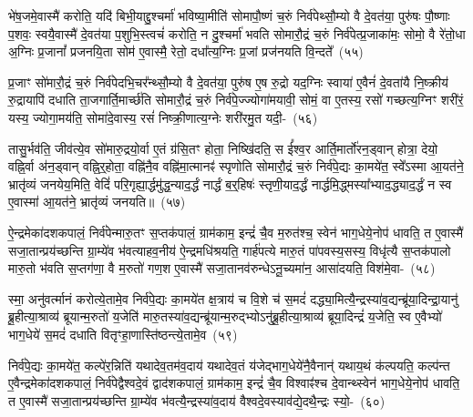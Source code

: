 भे॑ष॒जमे॒वास्मै॑ करोति॒ यदि॑ बिभी॒याद्दु॒श्चर्मा॑ भविष्या॒मीति॑ सोमापौ॒ष्णं च॒रुं निर्व॑पेथ्सौ॒म्यो वै दे॒वत॑या॒ पुरु॑षः पौ॒ष्णाः प॒शवः॒ स्वयै॒वास्मै॑ दे॒वत॑या प॒शुभि॒स्त्वचं॑ करोति॒ न दु॒श्चर्मा॑ भवति सोमारौ॒द्रं च॒रुं निर्व॑पेत्प्र॒जाका॑मः॒ सोमो॒ वै रे॑तो॒धा अ॒ग्निः प्र॒जानां᳚ प्रजनयि॒ता सोम॑ ए॒वास्मै॒ रेतो॒ दधा᳚त्य॒ग्निः प्र॒जां प्रज॑नयति वि॒न्दते᳚~(५५)

प्र॒जाꣳ सो॑मारौ॒द्रं च॒रुं निर्व॑पेदभि॒चर᳚न्थ्सौ॒म्यो वै दे॒वत॑या॒ पुरु॑ष ए॒ष रु॒द्रो यद॒ग्निः स्वाया॑ ए॒वैनं॑ दे॒वता॑यै नि॒ष्क्रीय॑ रु॒द्रायापि॑ दधाति ता॒जगार्ति॒मार्च्छ॑ति सोमारौ॒द्रं च॒रुं निर्व॑पे॒ज्ज्योगा॑मयावी॒ सोमं॒ वा ए॒तस्य॒ रसो॑ गच्छत्य॒ग्निꣳ शरी॑रं॒ यस्य॒ ज्योगा॒मय॑ति॒ सोमा॑दे॒वास्य॒ रसं॑ निष्क्री॒णात्य॒ग्नेः शरी॑रमु॒त यदी॒-~(५६)

तासु॒र्भव॑ति॒ जीव॑त्ये॒व सो॑मारु॒द्रयो॒र्वा ए॒तं ग्र॑सि॒तꣳ होता॒ निष्खि॑दति॒ स ई᳚श्व॒र आर्ति॒मार्तो॑रन॒ड्वान् होत्रा॒ देयो॒ वह्नि॒र्वा अ॑न॒ड्वान् वह्नि॒र्॒\mbox{}होता॒ वह्नि॑नै॒व वह्नि॑मा॒त्मानꣴ॑ स्पृणोति सोमारौ॒द्रं च॒रुं निर्व॑पे॒द्यः का॒मये॑त॒ स्वे᳚\-ऽस्मा आ॒यत॑ने॒ भ्रातृ॑व्यं जनयेय॒मिति॒ वेदिं॑ परि॒गृह्या॒र्द्धमु॑द्ध॒न्याद॒र्द्धं नार्द्धं ब॒र्॒\mbox{}हिषः॑ स्तृणी॒याद॒र्द्धं नार्द्धमि॒द्ध्मस्या᳚भ्याद॒द्ध्याद॒र्द्धं न स्व ए॒वास्मा॑ आ॒यत॑ने॒ भ्रातृ॑व्यं जनयति॥~(५७)

{\anuvakamend[{रु॒द्रो भे॑ष॒जं वि॒न्दते॒ यदि॑ स्तृणी॒याद॒र्द्धं द्वाद॑श च}]}

ऐ॒न्द्रमेका॑\-दश\-कपालं॒ निर्व॑पेन्मारु॒तꣳ स॒प्तक॑पालं॒ ग्राम॑काम॒ इन्द्रं॑ चै॒व म॒रुत॑श्च॒ स्वेन॑ भाग॒धेये॒नोप॑ धावति॒ त ए॒वास्मै॑ सजा॒तान्प्रय॑च्छन्ति ग्रा॒म्ये॑व भ॑वत्याहव॒नीय॑ ऐ॒न्द्रमधि॑श्रयति॒ गार्\mbox{}ह॑पत्ये मारु॒तं पा॑पवस्य॒सस्य॒ विधृ॑त्यै स॒प्तक॑पालो मारु॒तो भ॑वति स॒प्तग॑णा॒ वै म॒रुतो॑ गण॒श ए॒वास्मै॑ सजा॒तानव॑\-रुन्धे\-ऽनू॒च्यमा॑न॒ आसा॑दयति॒ विश॑मे॒वा-~(५८)

स्मा॒ अनु॑वर्त्मानं करोत्ये॒तामे॒व निर्व॑पे॒द्यः का॒मये॑त क्ष॒त्राय॑ च वि॒शे च॑ स॒मदं॑ दद्ध्या॒मित्यै॒न्द्रस्या॑व॒द्यन्ब्रू॑या॒दिन्द्रा॒यानु॑ ब्रू॒हीत्या॒श्राव्य॑ ब्रूयान्म॒रुतो॑ य॒जेति॑ मारु॒तस्या॑व॒द्यन्ब्रू॑यान्म॒रुद्भ्यो\-ऽनु॑ब्रू॒हीत्या॒श्राव्य॑ ब्रूया॒दिन्द्रं॑ य॒जेति॒ स्व ए॒वैभ्यो॑ भाग॒धेये॑ स॒मदं॑ दधाति वितृꣳहा॒णास्ति॑ष्ठन्त्ये॒तामे॒व~(५९)

निर्व॑पे॒द्यः का॒मये॑त॒ कल्पे॑र॒न्निति॑ यथादेव॒तम॑व॒दाय॑ यथादेव॒तं य॑जेद्भाग॒धेये॑नै॒वैनान्॑ यथाय॒थं क॑ल्पयति॒ कल्प॑न्त ए॒वैन्द्रमेका॑\-दश\-कपालं॒ निर्व॑पेद्वैश्वदे॒वं द्वाद॑श\-कपालं॒ ग्राम॑काम॒ इन्द्रं॑ चै॒व विश्वाꣴ॑श्च दे॒वान्थ्स्वेन॑ भाग॒धेये॒नोप॑ धावति॒ त ए॒वास्मै॑ सजा॒तान्प्रय॑च्छन्ति ग्रा॒म्ये॑व भ॑वत्यै॒न्द्रस्या॑व॒दाय॑ वैश्वदे॒वस्याव॑द्ये॒दथै॒न्द्रः स्यो॒-~(६०)

